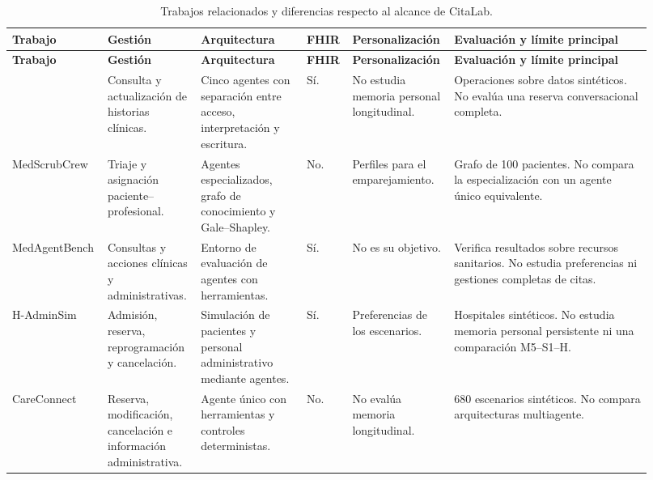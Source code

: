 \begin{landscape}
\small
\setlength{\tabcolsep}{3pt}
\begin{longtable}{L{0.12\linewidth}L{0.14\linewidth}L{0.16\linewidth}L{0.06\linewidth}L{0.14\linewidth}L{0.30\linewidth}}
\caption{Trabajos relacionados y diferencias respecto al alcance de CitaLab.}\label{tab:trabajos-relacionados}\\
\toprule
\textbf{Trabajo} & \textbf{Gestión} & \textbf{Arquitectura} & \textbf{FHIR} & \textbf{Personalización} & \textbf{Evaluación y límite principal} \\
\midrule
\endfirsthead
\toprule
\textbf{Trabajo} & \textbf{Gestión} & \textbf{Arquitectura} & \textbf{FHIR} & \textbf{Personalización} & \textbf{Evaluación y límite principal} \\
\midrule
\endhead
\citet{demaio2025privacy} & Consulta y actualización de historias clínicas. & Cinco agentes con separación entre acceso, interpretación y escritura. & Sí. & No estudia memoria personal longitudinal. & Operaciones sobre datos sintéticos. No evalúa una reserva conversacional completa. \\
MedScrubCrew \citeyearpar{ruiz2025medscrubcrew} & Triaje y asignación paciente--profesional. & Agentes especializados, grafo de conocimiento y Gale--Shapley. & No. & Perfiles para el emparejamiento. & Grafo de 100 pacientes. No compara la especialización con un agente único equivalente. \\
MedAgentBench \citeyearpar{jiang2025medagentbench} & Consultas y acciones clínicas y administrativas. & Entorno de evaluación de agentes con herramientas. & Sí. & No es su objetivo. & Verifica resultados sobre recursos sanitarios. No estudia preferencias ni gestiones completas de citas. \\
H-AdminSim \citeyearpar{lee2026hadminsim} & Admisión, reserva, reprogramación y cancelación. & Simulación de pacientes y personal administrativo mediante agentes. & Sí. & Preferencias de los escenarios. & Hospitales sintéticos. No estudia memoria personal persistente ni una comparación M5--S1--H. \\
CareConnect \citeyearpar{hasan2026careconnect} & Reserva, modificación, cancelación e información administrativa. & Agente único con herramientas y controles deterministas. & No. & No evalúa memoria longitudinal. & 680 escenarios sintéticos. No compara arquitecturas multiagente. \\
\bottomrule
\end{longtable}
\normalsize
\setlength{\tabcolsep}{6pt}
\end{landscape}

